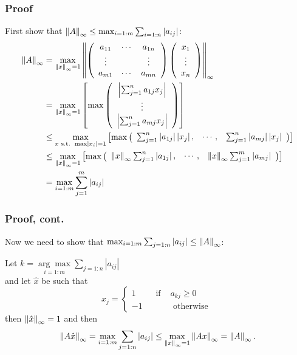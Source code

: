 \documentclass{beamer}
\begin{document}
\begin{frame}\frametitle{Proof}
	First show that $\left\| A \right\|_{\infty} \leq \max_{i=1:m}\sum_{i=1:n} \left|a_{ij}\right|$:
	\begin{align*} 
	\left\| A \right\|_{\infty} &= \max_{\left\| x \right\|_{\infty}=1}
	\left\| 
  		\left(
    		\begin{array}{ccc} 
      		a_{11} & \cdots & a_{1n} \\
      		\vdots & & \vdots \\
      		a_{m1} & \cdots & a_{mn}
    		\end{array}
  		\right)
  		\left(
    		\begin{array}{c}
      		x_1 \\
      		\vdots \\
      		x_n
    		\end{array}
  		\right)
	\right\|_{\infty}\\
	&= \max_{\left\| x \right\|_{\infty}=1} 
		\left[ 
  			\max \left(
    			\begin{array}{c}
      				\left|\sum_{j=1}^{n} a_{1j} x_j \right|\\
      				\vdots\\
      				\left|\sum_{j=1}^{n} a_{mj} x_j \right|
    			\end{array}
  			\right)
		\right] \\
	&\leq \max_{x \text{ s.t. } \max \left|x_i\right|=1} 
		\left[
  			\max \left(
    			\begin{array}{ccc}
      			\sum_{j=1}^{n}\left|a_{1j}\right|\left|x_j\right|, &
      			\cdots, &
      			\sum_{j=1}^{n}\left|a_{mj}\right|\left|x_j\right|
    			\end{array}
  			\right)
		\right]\\
	&\leq \max_{\left\| x \right\|_{\infty}=1} 
		\left[ 
			\max \left(
				\begin{array}{ccc}
				\left\| x \right\|_{\infty}\sum_{j=1}^{n}\left|a_{1j}\right|, &
				\cdots, &
				\left\| x \right\|_{\infty}\sum_{j=1}^{m}\left|a_{mj}\right|
				\end{array}
			\right)
		\right] \\
	&= \max_{i=1:m}\sum_{j=1}^{m}\left|a_{ij}\right|
	\end{align*}
\end{frame}

\begin{frame}\frametitle{Proof, cont.}
	Now we need to show that 
	$\max_{i=1:m} \sum_{j=1:n} \left|a_{ij}\right| \leq \left\|A\right\|_{\infty}$:
	
	\vfill 
	
	Let $k = \underset{i=1:m}{\arg\max} \sum_{j=1:n} |a_{ij}|$ \\
	and let $\hat{x}$ be such that 
	\[ 
	\hat{x}_j = \begin{cases}
					1 \qquad \text{ if } &a_{kj} \geq 0\\
					-1 \qquad &\text{ otherwise }
				\end{cases}
	\]
	then $\left\|\hat{x} \right\|_{\infty} = 1$ and then
	\[
	\left\|A\hat{x} \right\|_{\infty} = \max_{i=1:m} \sum_{j=1:n} |a_{ij}| \leq \max_{\left\|x \right\|_{\infty} = 1} \left\|Ax \right\|_{\infty} = \left\|A\right\|_{\infty}.
	\]
\end{frame}
\end{document}
